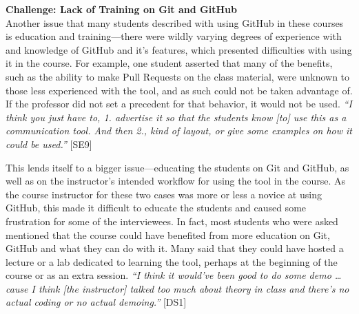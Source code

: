 

\textbf{Challenge: Lack of Training on Git and GitHub} \\
Another issue that many students described with using GitHub in these courses is education and training---there were wildly varying degrees of experience with and knowledge of GitHub and it's features, which presented difficulties with using it in the course. For example, one student asserted that many of the benefits, such as the ability to make Pull Requests on the class material, were unknown to those less experienced with the tool, and as such could not be taken advantage of. If the professor did not set a precedent for that behavior, it would not be used. \textit{``I think you just have to, 1. advertise it so that the students know [to] use this as a communication tool. And then 2., kind of layout, or give some examples on how it could be used.''} [SE9]

This lends itself to a bigger issue---educating the students on Git and GitHub, as well as on the instructor's intended workflow for using the tool in the course. As the course instructor for these two cases was more or less a novice at using GitHub, this made it difficult to educate the students and caused some frustration for some of the interviewees. In fact, most students who were asked mentioned that the course could have benefited from more education on Git, GitHub and what they can do with it. Many said that they could have hosted a lecture or a lab dedicated to learning the tool, perhaps at the beginning of the course or as an extra session. \textit{``I think it would've been good to do some demo \ldots cause I think [the instructor] talked too much about theory in class and there's no actual coding or no actual demoing.''} [DS1]


